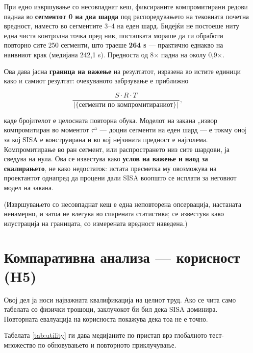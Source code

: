 При едно извршување со несовпаднат кеш, фиксираните компромитирани редови паднаа во
\textbf{сегментот 0 на два шарда} под распоредувањето на тековната почетна вредност, наместо во
сегментите 3–4 на еден шард. Бидејќи не постоеше ниту една чиста контролна точка пред нив,
постапката мораше да ги обработи повторно сите 250 сегменти, што траеше \textbf{264 s} --- практично еднакво на наивниот крак (медијана 242,1 s). Предноста од 8× падна на околу 0,9×.

Ова дава јасна \textbf{граница на важење} на резултатот, изразена во истите единици како и самиот
резултат: очекуваното забрзување е приближно

\[
\frac{S \cdot R \cdot T}{\,|\{\text{сегменти по компромитираниот}\}|\,},
\]

каде бројителот е целосната повторна обука. Моделот на закана „извор компромитиран во
моментот $\tau$“ --- доцни сегменти на еден шард --- е токму оној за кој SISA е конструирана и
во кој нејзината предност е најголема. Компромитирање во ран сегмент, или распространето низ
сите шардови, ја сведува на нула. Ова се известува како \textbf{услов на важење и наод за
скалирањето}, не како недостаток: истата пресметка му овозможува на проектантот однапред да
процени дали SISA воопшто се исплати за неговиот модел на закана.

(Извршувањето со несовпаднат кеш е една неповторена опсервација, настаната ненамерно, и
затоа не влегува во спарената статистика; се известува како илустрација на границата, со
измерената вредност наведена.)

\section{Компаративна анализа --- корисност (H5)}

Овој дел ја носи најважната квалификација на целиот труд. Ако се чита само табелата со
физички трошоци, заклучокот би бил дека SISA доминира. Повторната евалуација на корисноста
покажува дека тоа не е точно.

Табелата \ref{tab:utility} ги дава медијаните по пристап врз глобалното тест-множество по
обновувањето и повторното приклучување.




